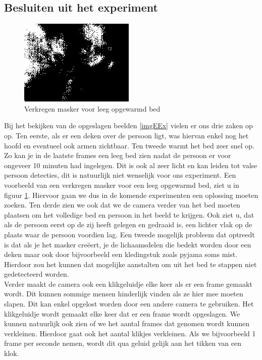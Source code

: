 \subsection{Besluiten uit het experiment}
\label{ERefOBB}
\begin{figure}[hbp]
	\includegraphics[scale = 0.75]{EersteExperiment_mask10}
	\caption{Verkregen masker voor leeg opgewarmd bed}
	\label{imgCOB}
\end{figure}
Bij het bekijken van de opgeslagen beelden \ref{imgEEx} vielen er ons drie zaken op op. Ten eerste, als er een deken over de persoon ligt, was hiervan enkel nog het hoofd en eventueel ook armen zichtbaar. Ten tweede warmt het bed zeer snel op. Zo kan je in de laatste frames een leeg bed zien nadat de persoon er voor ongeveer 10 minuten had ingelegen. Dit is ook al zeer licht en kan leiden tot valse persoon detecties, dit is natuurlijk niet wenselijk voor ons experiment. Een voorbeeld van een verkregen masker voor een leeg opgewarmd bed, ziet u in figuur \ref{imgCOB}.  Hiervoor gaan we dus in de komende experimenten een oplossing moeten zoeken. Ten derde zien we ook dat we de camera verder van het bed moeten plaatsen om het volledige bed en persoon in het beeld te krijgen. Ook ziet u, dat als de persoon eerst op de zij heeft gelegen en gedraaid is, een lichter vlak op de plaats waar de persoon voordien lag. Een tweede mogelijk probleem dat optreedt is dat als je het masker cre\"eert, je de lichaamsdelen die bedekt worden door een deken maar ook door bijvoorbeeld een kledingstuk zoals pyjama soms mist. Hierdoor zou het kunnen dat mogelijke aanstalten om uit het bed te stappen niet gedetecteerd worden. \\ 
Verder maakt de camera ook een klikgeluidje elke keer als er een frame gemaakt wordt. Dit kunnen sommige mensen hinderlijk vinden als ze hier mee moeten slapen. Dit kan enkel opgelost worden door een andere camera te gebruiken. Het klikgeluidje wordt gemaakt elke keer dat er een frame wordt opgeslagen. We kunnen natuurlijk ook zien of we het aantal frames dat genomen wordt kunnen verkleinen. Hierdoor gaat ook het aantal klikjes verkleinen. Als we bijvoorbeeld 1 frame per seconde nemen, wordt dit qua geluid gelijk aan het tikken van een klok.

